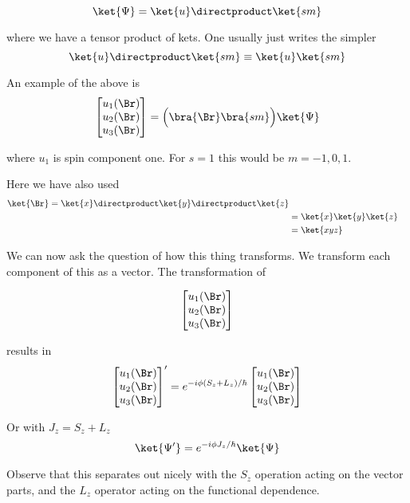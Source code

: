 \begin{equation}\label{eqn:PHY356FDec7:190}
\ket{\Psi} = \ket{u} \directproduct \ket{s m}
\end{equation}

where we have a tensor product of kets.  One usually just writes the simpler
\begin{equation}\label{eqn:PHY356FDec7:195}
\ket{u} \directproduct \ket{s m} \equiv \ket{u} \ket{s m}
\end{equation}

An example of the above is
\begin{equation}\label{eqn:PHY356FDec7:200}
\begin{bmatrix}
u_1(\Br) \\
u_2(\Br) \\
u_3(\Br) \\
\end{bmatrix}
= \Bigl( \bra{\Br} \bra{ s m} \Bigr) \ket{\Psi}
\end{equation}

where $u_1$ is spin component one.  For $s=1$ this would be $m=-1, 0, 1$.

Here we have also used
\begin{align*}
\ket{\Br}
=
\ket{x}
\directproduct
\ket{y}
\directproduct
\ket{z} \\
&=
\ket{x}
\ket{y}
\ket{z} \\
&=
\ket{x y z}
\end{align*}

We can now ask the question of how this thing transforms.  We transform each component of this as a vector.  The transformation of

\begin{align*}
\begin{bmatrix}
u_1(\Br) \\
u_2(\Br) \\
u_3(\Br)
\end{bmatrix}
\end{align*}

results in
\begin{equation}\label{eqn:PHY356FDec7:210}
{\begin{bmatrix}
u_1(\Br) \\
u_2(\Br) \\
u_3(\Br)
\end{bmatrix}}'
=
e^{ -i \phi (S_z + L_z)/\hbar }
\begin{bmatrix}
u_1(\Br) \\
u_2(\Br) \\
u_3(\Br)
\end{bmatrix}
\end{equation}

Or with $J_z = S_z + L_z$
\begin{equation}\label{eqn:PHY356FDec7:220}
\ket{\Psi'} = e^{-i \phi J_z/\hbar } \ket{\Psi}
\end{equation}

Observe that this separates out nicely with the $S_z$ operation acting on the vector parts, and the $L_z$ operator acting on the functional dependence.

